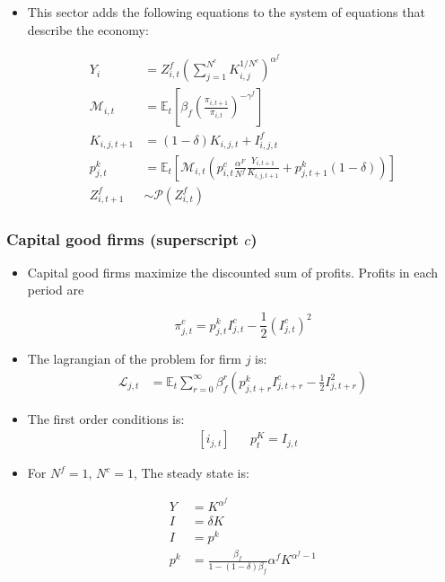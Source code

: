 \documentclass[11pt]{article}
\newcommand{\E}{\mathbb{E}}
\numberwithin{equation}{section}
\begin{document}
\begin{itemize}
\begin{itemize}
		
		
		\item This sector adds the following equations to the system of equations that describe the economy:
		
		\begin{align}
		Y_i & = Z^f_{i,t} \left( \sum_{j=1}^{N^c } K^{1/N^c}_{i,j}\right)^{\alpha^f} \\
		\mathcal{M}_{i,t} & = \E_t \left[ \beta_f \left(\frac{\pi_{i,t+1}}{\pi_{i,t}}\right)^{-\gamma^f} \right] \\
		K_{i,j,t+1} & = (1-\delta) K_{i,j,t} + I^f_{i,j,t} \\
		p^k_{j,t} & =\E_t  \left[\mathcal{M}_{i,t} \left( p^c_{i,t} \frac{\alpha^F}{N^f} \frac{Y_{i,t+1}}{K_{i,j,t+1}} +  p^k_{j,t+1} (1-\delta) \right) \right] \\
		Z^f_{i,t+1} & \sim \mathcal{P}(Z^f_{i,t})
		\end{align}
		
	\end{itemize}
	
	\subsubsection{Capital good firms (superscript $c$)}
	
	
	\begin{itemize}
		
		\item Capital good firms maximize the discounted sum of profits. Profits in each period are
		
		$$\pi^c_{j,t}=p^k_{j,t} I^c_{j,t}-\frac{1}{2} \left(I^c_{j,t}\right)^2  $$
		
		
		\item The lagrangian of the problem for firm $j$ is:
		\begin{align*}
		\mathcal{L}_{j,t} &= \E_t \sum_{r=0}^{\infty}\beta^r_f \left(
		p^k_{j,t+r} I^c_{j,t+r}-\frac{1}{2} I^2_{j,t+r} \right)
		\end{align*}
		
		\item The first order conditions is:
		\begin{align}
		& \left[i_{j,t}\right]&& p^K_{t} = I_{j,t}
		\end{align}
		
		
		\item  For $N^f=1$, $N^c=1$, The steady state is:
		
		\begin{align*}
		Y & =  	K^{\alpha^f}  \\
		I & = \delta K\\
		I & = p^k \\  
		p^k & =\frac{\beta_f}{1-(1-\delta)\beta_f}  \alpha^f K^{\alpha^f-1}  \\ 
		\end{align*}
		

\end{itemize}
\end{itemize}
\end{document}
